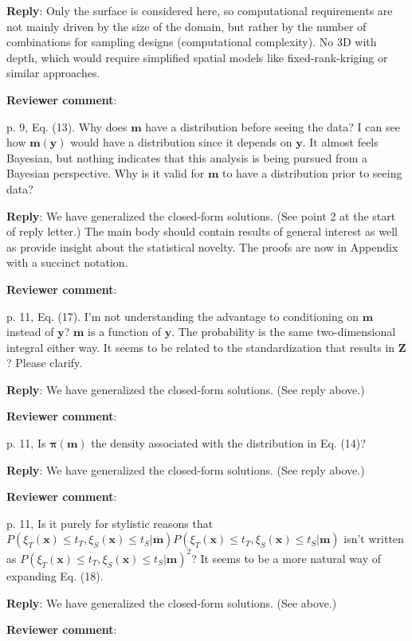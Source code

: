 \documentclass[a4paper]{article}
\newcommand{\bm}{ {\boldsymbol m} }
\newcommand{\bx}{ {\boldsymbol x} }
\newcommand{\by}{ {\boldsymbol y} }
\newcommand{\bZ}{ {\boldsymbol Z} }
\newcommand{\bpi}{ {\boldsymbol \pi} }
\def\revcom{\textbf{Reviewer comment}}
\def\reply{\textbf{Reply}}
\begin{document}
\begin{answers}
\reply: Only the surface is considered here, so computational requirements are not mainly driven by the size of the domain, but rather by the number of combinations for sampling designs (computational complexity). No 3D with depth, which would require simplified spatial models like fixed-rank-kriging or similar approaches. 

\item{\revcom  :}\label{r2c6}

p. 9, Eq. (13). Why does $\bm$ have a distribution before seeing the data? I can see how $\bm(\by)$ would have a distribution since it depends on $\by$. It almost feels Bayesian, but nothing indicates that this analysis is being pursued from a Bayesian perspective. Why is it valid for $\bm$ to have a distribution prior to seeing data?

\reply: We have generalized the closed-form solutions. (See point 2 at the start of reply letter.) The main body should contain results of general interest as well as provide insight about the statistical novelty. The proofs are now in Appendix with a succinct notation.

\item{\revcom :}\label{r2c7}

p. 11, Eq. (17). I’m not understanding the advantage to conditioning on $\bm$ instead of $\by$? $\bm$ is a function of $\by$. The probability is the same two-dimensional integral either way. It seems to be related to the standardization that results in $\bZ$? Please clarify.

\reply: We have generalized the closed-form solutions. (See reply above.)

\item{\revcom  :}\label{r2c8}

p. 11, Is $\bpi(\bm)$ the density associated with the distribution in Eq. (14)? 

\reply: We have generalized the closed-form solutions. (See reply above.)

\item{\revcom :}\label{r2c9}

p. 11, Is it purely for stylistic reasons that $P(\xi_T(\bx) \leq t_T, \xi_S(\bx) \leq t_S |\bm)P(\xi_T(\bx) \leq t_T, \xi_S(\bx) \leq t_S |\bm)$ isn’t written as $P(\xi_T(\bx) \leq t_T, \xi_S(\bx) \leq t_S |\bm)^2$? It seems to be a more natural way of expanding Eq. (18). 

\reply: We have generalized the closed-form solutions. (See above.)

\item{\revcom :}\label{r2c10}


\end{answers}
\end{document}

